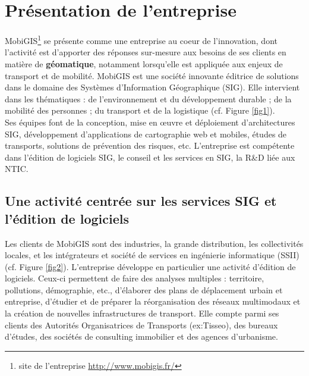 \chapter{Présentation de l'entreprise}
\label{PresentationEntreprise}

MobiGIS\footnote{site de l’entreprise \url{http://www.mobigis.fr/}} se présente comme une entreprise au coeur de l’innovation, dont l’activité est d’apporter des réponses sur-mesure aux besoins de ses clients en matière de \textbf{géomatique}, notamment lorsqu’elle est appliquée aux enjeux de transport et de mobilité. MobiGIS est une société innovante éditrice de solutions dans le domaine des Systèmes d’Information Géographique (SIG). 
Elle intervient dans les thématiques : de l’environnement et du développement durable ; de la mobilité des personnes ; du transport et de la logistique (cf. Figure \ref{fig1}).\\

Ses équipes font de la conception, mise en \oe uvre et déploiement d'architectures SIG, développement d’applications de cartographie web et mobiles, études de transports, solutions de prévention des risques, etc. L’entreprise est compétente dans l’édition de logiciels SIG, le conseil et les services en SIG, la R\&D liée aux NTIC.\\

\section{Une activité centrée sur les services SIG et l'édition de logiciels}

Les clients de MobiGIS sont des industries, la grande distribution, les collectivités locales, et les intégrateurs et société de services en ingénierie informatique (SSII) (cf. Figure \ref{fig2}). L’entreprise développe en particulier une activité d’édition de logiciels. Ceux-ci permettent de faire des analyses multiples : territoire, pollutions, démographie, etc., d’élaborer des plans de déplacement urbain et entreprise, d’étudier et de préparer la réorganisation des réseaux multimodaux et la création de nouvelles infrastructures de transport. Elle compte parmi ses clients des Autorités Organisatrices de Transports (ex:Tisseo), des bureaux d’études, des sociétés de consulting immobilier et des agences d’urbanisme.\\

